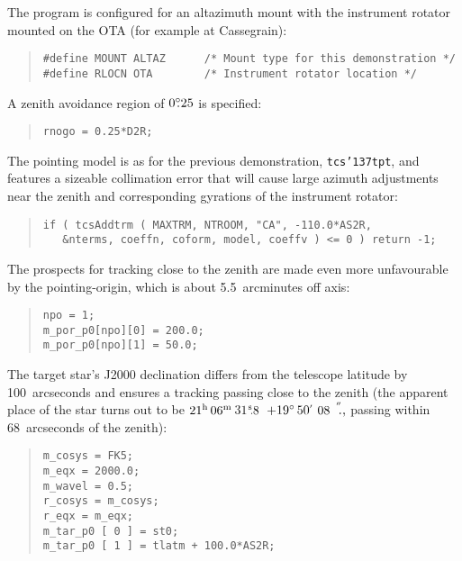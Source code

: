 \documentclass[12pt,fleqn,twoside]{article}
\renewcommand{\_}{{\tt\char'137}}     %
\newcommand{\degree}[2] {$#1^{\circ}
                        \hspace{-0.35em}.\hspace{0.04em}#2$}
\newcommand{\arcsec}[2] {\arcseci{#1}$\hspace{-0.4em}.#2$}
\newcommand{\arcseci}[1] {$#1\hspace{0.05em}$\raisebox{-0.5ex}
                         {$^{'\hspace{-0.1em}'}$}}
\newcommand{\dms}[4]    {$#1^{\circ}\,#2\raisebox{-0.5ex}
                        {$^{'}$}\,$\arcsec{#3}{#4}}
\newcommand{\tsec}[2]   {\tseci{#1}$\hspace{-0.3em}.#2$}
\newcommand{\tseci}[1]  {$#1$\mbox{$^{\rm s}$}}
\newcommand{\hms}[4]    {$#1^{\rm h}\,#2^{\rm m}\,$\tsec{#3}{#4}}
\begin{document}
The program is configured for an altazimuth mount
with the instrument rotator mounted on the OTA (for example
at Cassegrain):
\begin{quote}
\begin{small}
\begin{verbatim}
#define MOUNT ALTAZ      /* Mount type for this demonstration */
#define RLOCN OTA        /* Instrument rotator location */
\end{verbatim}\end{small}
\end{quote}
A zenith avoidance region of \degree{0}{25} is specified:
\begin{quote}
\begin{small}
\begin{verbatim}
rnogo = 0.25*D2R;
\end{verbatim}\end{small}
\end{quote}
The pointing model is as for the previous demonstration, {\tt tcs\_tpt},
and features a sizeable collimation error that will cause large
azimuth adjustments near the zenith and corresponding gyrations
of the instrument rotator:
\begin{quote}
\begin{small}
\begin{verbatim}
if ( tcsAddtrm ( MAXTRM, NTROOM, "CA", -110.0*AS2R,
   &nterms, coeffn, coform, model, coeffv ) <= 0 ) return -1;
\end{verbatim}\end{small}
\end{quote}
The prospects for tracking close to the zenith are made even more
unfavourable by the pointing-origin, which is about 5.5~arcminutes
off axis:
\begin{quote}
\begin{small}
\begin{verbatim}
npo = 1;
m_por_p0[npo][0] = 200.0;
m_por_p0[npo][1] = 50.0;
\end{verbatim}\end{small}
\end{quote}
The target star's J2000 declination differs from the telescope
latitude by 100~arcseconds and ensures a tracking passing close to
the zenith (the apparent place of the star turns out to be
\hms{21}{06}{31}{8}~\dms{+19}{50}{08}, passing within 68~arcseconds
of the zenith):
\begin{quote}
\begin{small}
\begin{verbatim}
m_cosys = FK5;
m_eqx = 2000.0;
m_wavel = 0.5;
r_cosys = m_cosys;
r_eqx = m_eqx;
m_tar_p0 [ 0 ] = st0;
m_tar_p0 [ 1 ] = tlatm + 100.0*AS2R;
\end{verbatim}\end{small}
\end{quote}
\end{document}
